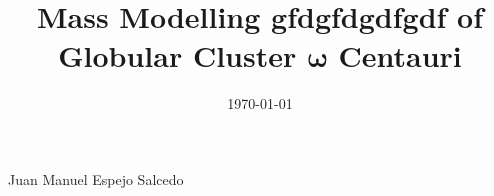 \documentclass[a4paper, 11pt, oneside]{Thesis}  %
\begin{document}
\frontmatter      %

\title  {Mass Modelling gfdgfdgdfgdf of Globular Cluster $\mathbf{\omega}$ Centauri}
            
\authors  
            {{Juan Manuel Espejo Salcedo}}
            
           
\addresses  {\groupname\\\deptname\\\univname}  %
\date       {\today}
\subject    {}
\keywords   {}

\maketitle


\fancyhead{}  %
\rhead{\thepage}  %
\lhead{}  %

\pagestyle{fancy}  %




 
\end{document}
